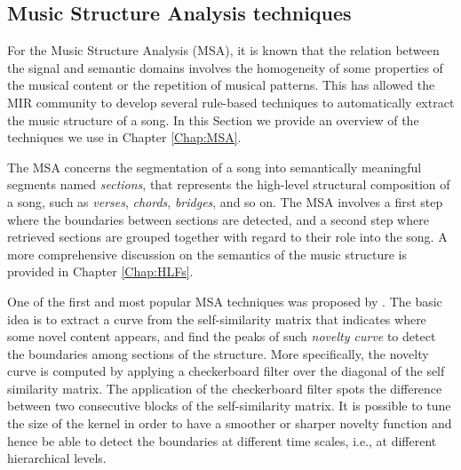 

\subsection{Music Structure Analysis techniques}\label{sec:ML:MSA}
For the Music Structure Analysis (MSA), it is known that the relation between the signal and semantic domains involves the homogeneity of some properties of the musical content or the repetition of musical patterns. This has allowed the MIR community to develop several rule-based techniques to automatically extract the music structure of a song. In this Section we provide an overview of the techniques we use in Chapter \ref{Chap:MSA}.%

The MSA concerns the segmentation of a song into semantically meaningful segments named \textit{sections}, that represents the high-level structural composition of a song, such as \textit{verses}, \textit{chords}, \textit{bridges}, and so on. The MSA involves a first step where the boundaries between sections are detected, and a second step where retrieved sections are grouped together with regard to their role into the song. A more comprehensive discussion on the semantics of the music structure is provided in Chapter \ref{Chap:HLFs}.

One of the first and most popular MSA techniques was proposed by \cite{foote2000automatic}. The basic idea is to extract a curve from the self-similarity matrix that indicates where some novel content appears, and find the peaks of such \textit{novelty curve} to detect the boundaries among sections of the structure. More specifically, the novelty curve is computed by applying a checkerboard filter over the diagonal of the self similarity matrix. The application of the checkerboard filter spots the difference between two consecutive blocks of the self-similarity matrix. It is possible to tune the size of the kernel in order to have a smoother or sharper novelty function and hence be able to detect the boundaries at different time scales, i.e., at different hierarchical levels. 

